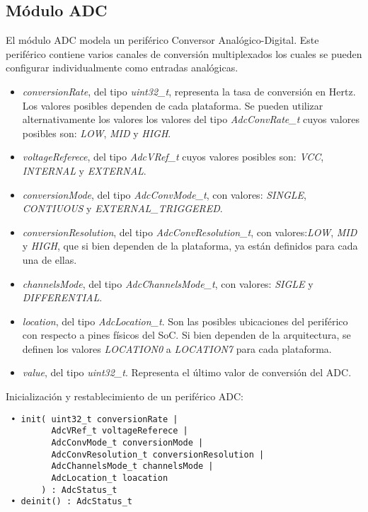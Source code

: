 
\subsection{Módulo ADC}

El módulo ADC modela un periférico Conversor Analógico-Digital. Este periférico contiene varios canales de conversión multiplexados los cuales se pueden configurar individualmente como entradas analógicas.


\begin{itemize}
\item
\emph{conversionRate}, del tipo \emph{uint32\_t}, representa la tasa de conversión en Hertz. Los valores posibles dependen de cada plataforma. Se pueden utilizar alternativamente los valores los valores del tipo \emph{AdcConvRate\_t} cuyos valores posibles son: \emph{LOW}, \emph{MID} y \emph{HIGH}.
\item
\emph{voltageReferece}, del tipo \emph{AdcVRef\_t} cuyos valores posibles son: \emph{VCC}, \emph{INTERNAL} y \emph{EXTERNAL}.
\item
\emph{conversionMode}, del tipo \emph{AdcConvMode\_t}, con valores: \emph{SINGLE}, \emph{CONTIUOUS} y \emph{EXTERNAL\_TRIGGERED}.
\item
\emph{conversionResolution}, del tipo \emph{AdcConvResolution\_t}, con valores:\emph{LOW}, \emph{MID} y \emph{HIGH}, que si bien dependen de la plataforma, ya están definidos para cada una de ellas.
\item
\emph{channelsMode}, del tipo \emph{AdcChannelsMode\_t}, con valores: \emph{SIGLE} y \emph{DIFFERENTIAL}.
\item
\emph{location}, del tipo \emph{AdcLocation\_t}. Son las posibles ubicaciones del periférico con respecto a pines físicos del SoC. Si bien dependen de la arquitectura, se definen los valores \emph{LOCATION0} a \emph{LOCATION7} para cada plataforma.
\item
\emph{value}, del tipo \emph{uint32\_t}. Representa el último valor de conversión del ADC.
\end{itemize}


Inicialización y restablecimiento de un periférico ADC:

\begin{verbatim}
 • init( uint32_t conversionRate | 
         AdcVRef_t voltageReferece |
         AdcConvMode_t conversionMode |
         AdcConvResolution_t conversionResolution |
         AdcChannelsMode_t channelsMode |
         AdcLocation_t loacation
       ) : AdcStatus_t
 • deinit() : AdcStatus_t
\end{verbatim}

